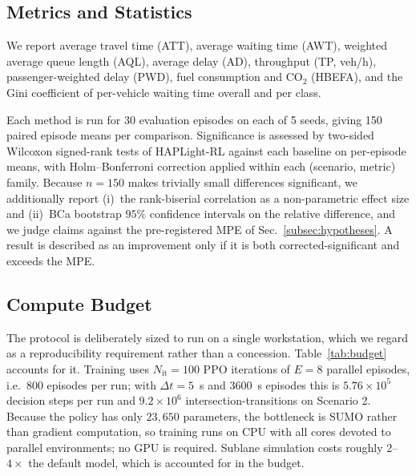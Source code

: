 \documentclass[journal]{IEEEtran}
\begin{document}
\subsection{Metrics and Statistics}
\label{subsec:stats}
We report average travel time (ATT), average waiting time (AWT),
weighted average queue length (AQL), average delay (AD), throughput (TP,
veh/h), passenger-weighted delay (PWD), fuel consumption and CO$_2$
(HBEFA), and the Gini coefficient of per-vehicle waiting time overall and
per class.

Each method is run for 30 evaluation episodes on each of 5 seeds, giving
150 paired episode means per comparison. Significance is assessed by
two-sided Wilcoxon signed-rank tests of HAPLight-RL against each baseline
on per-episode means, with Holm--Bonferroni correction applied within
each (scenario, metric) family. Because $n=150$ makes trivially small
differences significant, we additionally report (i)~the rank-biserial
correlation as a non-parametric effect size and (ii)~BCa bootstrap
$95\%$ confidence intervals on the relative difference, and we judge
claims against the pre-registered MPE of
Sec.~\ref{subsec:hypotheses}. A result is described as an improvement
only if it is both corrected-significant and exceeds the MPE.

\subsection{Compute Budget}
\label{subsec:compute}
The protocol is deliberately sized to run on a single workstation, which
we regard as a reproducibility requirement rather than a concession.
Table~\ref{tab:budget} accounts for it. Training uses
$N_{\mathrm{it}}=100$ PPO iterations of $E=8$ parallel episodes, i.e.\
800 episodes per run; with $\Delta t=5$~s and 3600~s episodes this is
$5.76\times10^5$ decision steps per run and $9.2\times10^6$
intersection-transitions on Scenario 2. Because the policy has only
$23{,}650$ parameters, the bottleneck is SUMO rather than gradient
computation, so training runs on CPU with all cores devoted to parallel
environments; no GPU is required. Sublane simulation costs roughly
$2$--$4\times$ the default model, which is accounted for in the budget.
\end{document}
